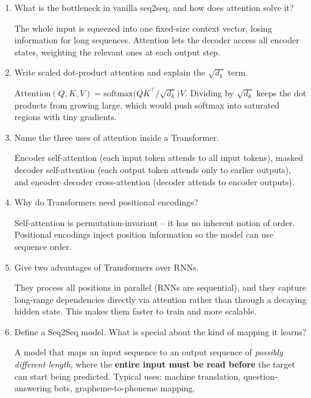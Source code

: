 \documentclass[10pt,a4paper]{article}
\newcommand{\q}[1]{\item #1}
\begin{document}
\begin{enumerate}[leftmargin=*,label=\textbf{Q\arabic*.}]

\q What is the bottleneck in vanilla seq2seq, and how does attention solve it?
\begin{answerbox}
The whole input is squeezed into one fixed-size context vector, losing information for long sequences. Attention lets the decoder access all encoder states, weighting the relevant ones at each output step.
\end{answerbox}

\q Write scaled dot-product attention and explain the $\sqrt{d_k}$ term.
\begin{answerbox}
$\mathrm{Attention}(Q,K,V)=\mathrm{softmax}\!\big(QK^\top/\sqrt{d_k}\big)V$. Dividing by $\sqrt{d_k}$ keeps the dot products from growing large, which would push softmax into saturated regions with tiny gradients.
\end{answerbox}

\q Name the three uses of attention inside a Transformer.
\begin{answerbox}
Encoder self-attention (each input token attends to all input tokens), masked decoder self-attention (each output token attends only to earlier outputs), and encoder--decoder cross-attention (decoder attends to encoder outputs).
\end{answerbox}

\q Why do Transformers need positional encodings?
\begin{answerbox}
Self-attention is permutation-invariant -- it has no inherent notion of order. Positional encodings inject position information so the model can use sequence order.
\end{answerbox}

\q Give two advantages of Transformers over RNNs.
\begin{answerbox}
They process all positions in parallel (RNNs are sequential), and they capture long-range dependencies directly via attention rather than through a decaying hidden state. This makes them faster to train and more scalable.
\end{answerbox}

\q Define a Seq2Seq model. What is special about the kind of mapping it learns?
\begin{answerbox}
A model that maps an input sequence to an output sequence of \emph{possibly different length}, where the \textbf{entire input must be read before} the target can start being predicted. Typical uses: machine translation, question-answering bots, grapheme-to-phoneme mapping.
\end{answerbox}


\end{enumerate}
\end{document}
